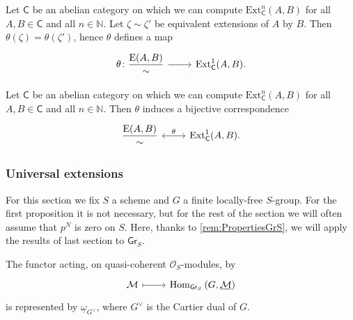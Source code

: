 \documentclass[../Main]{subfiles}
\begin{document}
\begin{lem}
	Let $\mathsf{C}$ be an abelian category on which we
	can compute $\mathrm{Ext}^n_{\mathsf{C}}(A,B)$
	for all $A, B \in \mathsf{C}$ and all $n \in \mathbb{N}$.
	Let $\zeta \sim \zeta'$ be equivalent extensions of
	$A$ by $B$.
	Then $\theta(\zeta) = \theta(\zeta')$, hence $\theta$
	defines a map
	\begin{equation*}
	\begin{tikzcd}[row sep = 0ex
		,/tikz/column 1/.append style={anchor=base east}
		,/tikz/column 2/.append style={anchor=base west}]
		\theta\colon \displaystyle{\frac{\mathrm{E}(A,B)}{\sim}} 
		\arrow[r, "", rightarrow] &
		\mathrm{Ext}^1_{\mathsf{C}}(A,B)
	.\end{tikzcd}
	\end{equation*} 
\end{lem} 


\begin{thm}\label{thm:CorrExt}
	Let $\mathsf{C}$ be an abelian category on which we
	can compute $\mathrm{Ext}^n_{\mathsf{C}}(A,B)$
	for all $A, B \in \mathsf{C}$ and all $n \in \mathbb{N}$.
	Then $\theta$ induces a bijective correspondence
	\begin{equation*}
	\begin{tikzcd}[row sep = 0ex
		,/tikz/column 1/.append style={anchor=base east}
		,/tikz/column 2/.append style={anchor=base west}]
		\displaystyle{\frac{\mathrm{E}(A,B)}{\sim}} 
		\arrow[r, "\theta", leftrightarrow] &
		\mathrm{Ext}^1_{\mathsf{C}}(A,B)
	.\end{tikzcd}
	\end{equation*} 
\end{thm} 



\subsubsection{Universal extensions}
For this section we fix $S$ a scheme and $G$ a finite locally-free $S$-group.
For the first proposition it is not necessary, but for the rest of the section we will often
assume that $p^N$ is zero on $S$.
Here, thanks to \cref{rem:PropertiesGrS},
we will apply the results of last section to $\mathsf{Gr}_S$.


\begin{prop}\label{prop:ReprhM}
	The functor acting, on quasi-coherent $\mathcal{O}_{ S }$-modules, by
	\begin{equation*}
	\begin{tikzcd}[row sep = 0ex
		,/tikz/column 1/.append style={anchor=base east}
		,/tikz/column 2/.append style={anchor=base west}]
		\mathcal{M} \arrow[r, "", mapsto] & 
		\mathrm{Hom}_{ \mathsf{Gr}_S } \left( G, \underline{\mathcal{M}} \right)
	\end{tikzcd}
	\end{equation*} 
	is represented by $\underline{\omega}_{G^\vee}$, where $G^\vee$ is
	the Cartier dual of $G$.
\end{prop}
\end{document}
